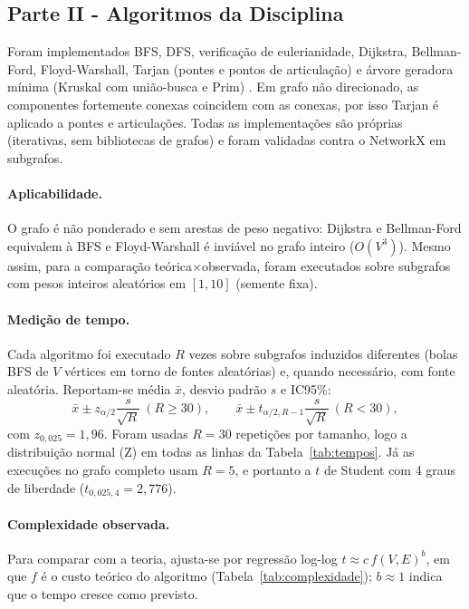 \documentclass[sigconf]{webmedia}
\begin{document}
\subsection{Parte II - Algoritmos da Disciplina}
Foram implementados BFS, DFS, verificação de eulerianidade, Dijkstra, Bellman-Ford, Floyd-Warshall, Tarjan (pontes e pontos de articulação) e árvore geradora mínima (Kruskal com união-busca e Prim) \cite{cormen2009,tarjan1972}. Em grafo não direcionado, as componentes fortemente conexas coincidem com as conexas, por isso Tarjan é aplicado a pontes e articulações.
Todas as implementações são próprias (iterativas, sem bibliotecas de grafos) e foram validadas contra o NetworkX em subgrafos.

\paragraph{Aplicabilidade.} O grafo é não ponderado e sem arestas de peso negativo: Dijkstra e Bellman-Ford equivalem à BFS e Floyd-Warshall é inviável no grafo inteiro ($O(V^3)$). Mesmo assim, para a comparação teórica$\times$observada, foram executados sobre subgrafos com pesos inteiros aleatórios em $[1,10]$ (semente fixa).

\paragraph{Medição de tempo.} Cada algoritmo foi executado $R$ vezes sobre subgrafos induzidos diferentes (bolas BFS de $V$ vértices em torno de fontes aleatórias) e, quando necessário, com fonte aleatória. Reportam-se média $\bar{x}$, desvio padrão $s$ e IC95\%:
\begin{equation}
  \bar{x}\pm z_{\alpha/2}\frac{s}{\sqrt{R}}\ (R\ge 30),\qquad
  \bar{x}\pm t_{\alpha/2,R-1}\frac{s}{\sqrt{R}}\ (R<30),
\end{equation}
com $z_{0{,}025}=1{,}96$. Foram usadas $R=30$ repetições por tamanho, logo a distribuição normal (Z) em todas as linhas da Tabela~\ref{tab:tempos}. Já as execuções no grafo completo usam $R=5$, e portanto a $t$ de Student com 4 graus de liberdade ($t_{0{,}025,4}=2{,}776$).

\paragraph{Complexidade observada.} Para comparar com a teoria, ajusta-se por regressão log-log $t\approx c\,f(V,E)^b$, em que $f$ é o custo teórico do algoritmo (Tabela~\ref{tab:complexidade}); $b\approx1$ indica que o tempo cresce como previsto.
\end{document}
